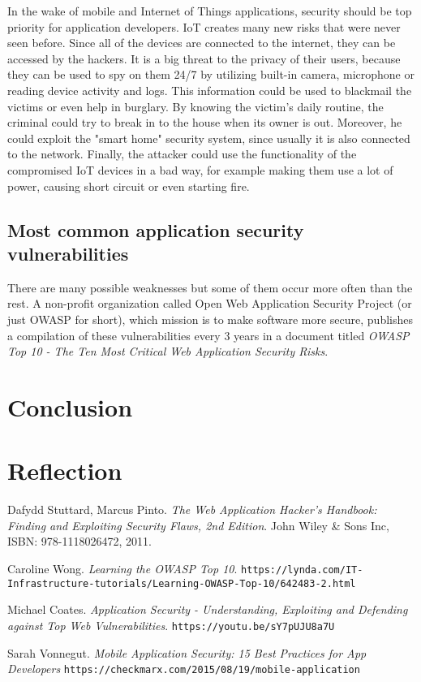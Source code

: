 \documentclass[a4paper]{article}
\begin{document}
In the wake of mobile and Internet of Things applications, security should be
top priority for application developers. IoT creates many new risks that were
never seen before. Since all of the devices are connected to the internet, they
can be accessed by the hackers. It is a big threat to the privacy of their
users, because they can be used to spy on them 24/7 by utilizing built-in
camera, microphone or reading device activity and logs. This information could
be used to blackmail the victims or even help in burglary. By knowing the
victim's daily routine, the criminal could try to break in to the house when its
owner is out. Moreover, he could exploit the "smart home" security system, since
usually it is also connected to the network. Finally, the attacker could use the
functionality of the compromised IoT devices in a bad way, for example making
them use a lot of power, causing short circuit or even starting fire.

\subsection{Most common application security vulnerabilities}

There are many possible weaknesses but some of them occur more often than the
rest. A non-profit organization called Open Web Application Security Project
(or just OWASP for short), which mission is to make software more secure,
publishes a compilation of these vulnerabilities every 3 years in a document
titled \textit{OWASP Top 10 - The Ten Most Critical Web Application Security
Risks}.

\section{Conclusion}

\section{Reflection}

\begin{thebibliography}{9}

		Dafydd Stuttard, Marcus Pinto.
		\textit{The Web Application Hacker's Handbook: Finding and
		Exploiting Security Flaws, 2nd Edition}.
		John Wiley \& Sons Inc, ISBN: 978-1118026472, 2011.

		Caroline Wong.
		\textit{Learning the OWASP Top 10}.
		\texttt{https://lynda.com/IT-\allowbreak{}
		Infrastructure-tutorials/Learning-OWASP-Top-10/642483-2.html}
		
		Michael Coates.
		\textit{Application Security - Understanding, Exploiting and
		Defending against Top Web Vulnerabilities}.
		\texttt{https://youtu.be/sY7pUJU8a7U}

		Sarah Vonnegut.
		\textit{Mobile Application Security: 15 Best Practices for App
		Developers}
		\texttt{https://checkmarx.com/2015/08/19/mobile-application}
\end{thebibliography}
\end{document}
